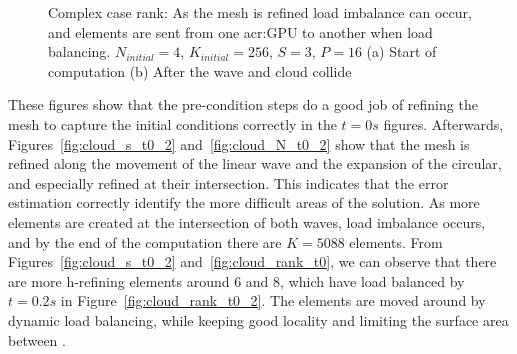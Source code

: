 \begin{figure}[H]
	\centering
	\hfill
	\caption{Complex case rank: As the mesh is refined load imbalance can occur, and elements are sent from one \acrshort{acr:GPU} to another when load balancing. \(N_{initial} = 4\), \(K_{initial} = 256\), \(S = 3\), \(P = 16\) (a) Start of computation (b) After the wave and cloud collide}\label{fig:cloud_rank}
\end{figure}

These figures show that the pre-condition steps do a good job of refining the mesh to capture the
initial conditions correctly in the \(t = 0 s\) figures. Afterwards, Figures~\ref{fig:cloud_s_t0_2}
and~\ref{fig:cloud_N_t0_2} show that the mesh is refined along the movement of the linear wave and
the expansion of the circular, and especially refined at their intersection. This indicates that the
error estimation correctly identify the more difficult areas of the solution. As more elements are
created at the intersection of both waves, load imbalance occurs, and by the end of the computation
there are \(K = 5088\) elements. From Figures~\ref{fig:cloud_s_t0_2} and~\ref{fig:cloud_rank_t0}, we
can observe that there are more h-refining elements around  \(6\) and \(8\),
which have load balanced by \(t = 0.2 s\) in Figure~\ref{fig:cloud_rank_t0_2}. The elements are
moved around by dynamic load balancing, while keeping good locality and limiting the surface area
between .

